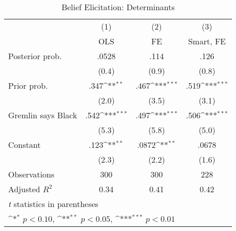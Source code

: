 \begin{table}[htbp]\centering
\def\sym#1{\ifmmode^{#1}\else\(^{#1}\)\fi}
\caption{Belief Elicitation: Determinants}
\begin{tabular}{l*{3}{c}}
\hline\hline
                &\multicolumn{1}{c}{(1)}&\multicolumn{1}{c}{(2)}&\multicolumn{1}{c}{(3)}\\
                &\multicolumn{1}{c}{OLS}&\multicolumn{1}{c}{FE}&\multicolumn{1}{c}{Smart, FE}\\
\hline
Posterior prob. &    .0528         &     .114         &     .126         \\
                &    (0.4)         &    (0.9)         &    (0.8)         \\
Prior prob.     &     .347\sym{**} &     .467\sym{***}&     .519\sym{***}\\
                &    (2.0)         &    (3.5)         &    (3.1)         \\
Gremlin says Black&     .542\sym{***}&     .497\sym{***}&     .506\sym{***}\\
                &    (5.3)         &    (5.8)         &    (5.0)         \\
Constant        &     .123\sym{**} &    .0872\sym{**} &    .0678         \\
                &    (2.3)         &    (2.2)         &    (1.6)         \\
\hline
Observations    &      300         &      300         &      228         \\
Adjusted \(R^{2}\)&     0.34         &     0.41         &     0.42         \\
\hline\hline
\multicolumn{4}{l}{\footnotesize \textit{t} statistics in parentheses}\\
\multicolumn{4}{l}{\footnotesize \sym{*} \(p<0.10\), \sym{**} \(p<0.05\), \sym{***} \(p<0.01\)}\\
\end{tabular}
\end{table}
